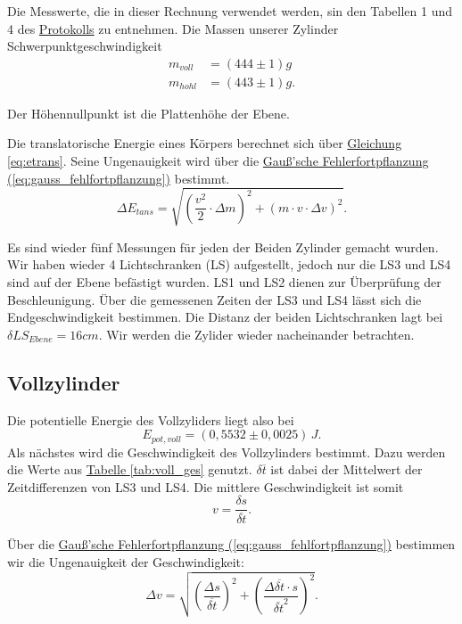 Die Messwerte, die in dieser Rechnung verwendet werden, sin den Tabellen 1 und 4 des \hyperref[Protokoll]{Protokolls} zu entnehmen. Die Massen unserer Zylinder Schwerpunktgeschwindigkeit
\begin{align}
    m_{voll} &= (444 \pm 1) g \\
    m_{hohl} &= (443 \pm 1) g.
\end{align}



Der Höhennullpunkt ist die Plattenhöhe der Ebene.

Die translatorische Energie eines Körpers berechnet sich über \hyperref[eq:etrans]{Gleichung \ref*{eq:etrans}}. Seine Ungenauigkeit wird über die \hyperref[eq:gauss_fehlfortpflanzung]{Gauß'sche Fehlerfortpflanzung (\ref*{eq:gauss_fehlfortpflanzung})} bestimmt.
\begin{equation}
    \Delta E_{tans} = \sqrt{\left(\frac{v^2}{2} \cdot \Delta m\right)^2 + \left(m\cdot v \cdot \Delta v \right)^2}.
\end{equation}

Es sind wieder fünf Messungen für jeden der Beiden Zylinder gemacht wurden. Wir haben wieder 4 Lichtschranken (LS) aufgestellt, jedoch nur die LS3 und LS4 sind auf der Ebene befästigt wurden. LS1 und LS2 dienen zur Überprüfung der Beschleunigung. Über die gemessenen Zeiten der LS3 und LS4 lässt sich die Endgeschwindigkeit bestimmen. Die Distanz der beiden Lichtschranken lagt bei $\delta LS_{Ebene} = 16 cm$. Wir werden die Zylider wieder nacheinander betrachten.

\subsection*{Vollzylinder}
Die potentielle Energie des Vollzyliders liegt also bei 
\begin{equation}
\boxed{
    E_{pot,voll} = (0,5532 \pm 0,0025)\, J
}.
\end{equation}
Als nächstes wird die Geschwindigkeit des Vollzylinders bestimmt. Dazu werden die Werte aus \hyperref[tab:voll_ges]{Tabelle \ref*{tab:voll_ges}} genutzt. $\delta\overline{t}$ ist dabei der Mittelwert der Zeitdifferenzen von LS3 und LS4. Die mittlere Geschwindigkeit ist somit
\begin{equation}
    v = \frac{\delta s}{\overline{\delta t}}.
\end{equation}

Über die \hyperref[eq:gauss_fehlfortpflanzung]{Gauß'sche Fehlerfortpflanzung (\ref*{eq:gauss_fehlfortpflanzung})} bestimmen wir die Ungenauigkeit der Geschwindigkeit:
\begin{equation}
    \Delta v =  \sqrt{\left(\frac{\Delta s}{\overline{\delta t}}\right)^2 +\left(\frac{\Delta \overline{\delta t} \cdot s}{\overline{\delta t} ^2}\right)^2}.
\end{equation}

